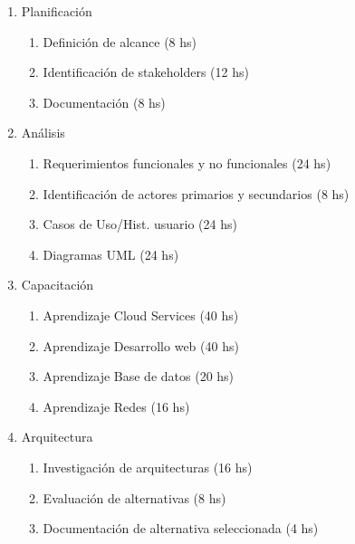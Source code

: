 \documentclass[11pt]{charter}
\begin{document}
\begin{consigna}

\begin{enumerate}

\item Planificación

        \begin{enumerate}
        \item Definición de alcance (8 hs)
        \item Identificación de stakeholders (12 hs)
        \item Documentación (8 hs)
        \end{enumerate}

\item Análisis

        \begin{enumerate}
        \item Requerimientos funcionales y no funcionales (24 hs)
        \item Identificación de actores primarios y secundarios (8 hs)
        \item Casos de Uso/Hist. usuario (24 hs)
        \item Diagramas UML (24 hs)
        \end{enumerate}

\item Capacitación

        \begin{enumerate}

        \item Aprendizaje Cloud Services (40 hs)
        \item Aprendizaje Desarrollo web  (40 hs)
        \item Aprendizaje Base de datos  (20 hs)
        \item Aprendizaje Redes  (16 hs)
        \end{enumerate}

\item Arquitectura

        \begin{enumerate}

        \item Investigación de arquitecturas (16 hs)
        \item Evaluación de alternativas (8 hs)
        \item Documentación de alternativa seleccionada (4 hs)
        \end{enumerate}


\end{enumerate}
\end{consigna}
\end{document}
